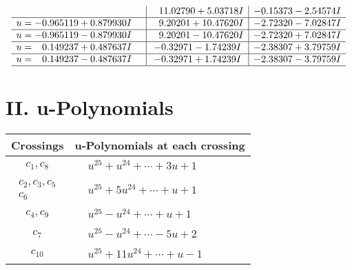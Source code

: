 \documentclass[1p]{elsarticle_modified}
\theoremstyle{definition}
\begin{document}
$$\begin{array}{c|c|c}
 & \phantom{-}11.02790 + 5.03718 I & -0.15373 - 2.54574 I \\ \hline\begin{aligned}
u &= -0.965119 + 0.879930 I\end{aligned}
 & \phantom{-}9.20201 + 10.47620 I & -2.72320 - 7.02847 I \\ \hline\begin{aligned}
u &= -0.965119 - 0.879930 I\end{aligned}
 & \phantom{-}9.20201 - 10.47620 I & -2.72320 + 7.02847 I \\ \hline\begin{aligned}
u &= \phantom{-}0.149237 + 0.487637 I\end{aligned}
 & -0.32971 - 1.74239 I & -2.38307 + 3.79759 I \\ \hline\begin{aligned}
u &= \phantom{-}0.149237 - 0.487637 I\end{aligned}
 & -0.32971 + 1.74239 I & -2.38307 - 3.79759 I\\
 \hline 
 \end{array}$$\newpage
\newpage\renewcommand{\arraystretch}{1}
\centering \section*{ II. u-Polynomials}
\begin{tabular}{m{50pt}|m{274pt}}
Crossings & \hspace{64pt}u-Polynomials at each crossing \\
\hline $$\begin{aligned}c_{1},c_{8}\end{aligned}$$&$\begin{aligned}
&u^{25}+u^{24}+\cdots+3 u+1
\end{aligned}$\\
\hline $$\begin{aligned}c_{2},c_{3},c_{5}\\c_{6}\end{aligned}$$&$\begin{aligned}
&u^{25}+5 u^{24}+\cdots+u+1
\end{aligned}$\\
\hline $$\begin{aligned}c_{4},c_{9}\end{aligned}$$&$\begin{aligned}
&u^{25}- u^{24}+\cdots+u+1
\end{aligned}$\\
\hline $$\begin{aligned}c_{7}\end{aligned}$$&$\begin{aligned}
&u^{25}- u^{24}+\cdots-5 u+2
\end{aligned}$\\
\hline $$\begin{aligned}c_{10}\end{aligned}$$&$\begin{aligned}
&u^{25}+11 u^{24}+\cdots+u-1
\end{aligned}$\\
\hline
\end{tabular}\newpage\renewcommand{\arraystretch}{1}
\end{document}
